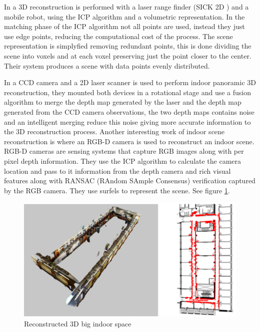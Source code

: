 In \cite{keqiang} a 3D reconstruction is performed with a laser range finder (SICK 2D ) and a mobile robot, 
using the ICP algorithm and a volumetric representation. In the matching phase of the ICP algorithm not all
 points are used, instead they just use edge points, reducing the computational cost of the process. The scene 
 representation is simplyfied removing redundant points, this is done dividing the scene into voxels and at each 
 voxel preserving just the point closer to the center. Their system produces a scene with data points evenly 
 distributed.

In \cite{wei} a CCD camera and a 2D laser scanner is used to perform indoor panoramic 3D reconstruction, 
they mounted both devices in a rotational stage and use a fusion algorithm to merge the depth map generated by the laser 
and the depth map generated from the CCD camera observations, the two depth maps contains noise and an intelligent merging reduce this
 noise giving more accurate information to the 3D reconstruction process. Another interesting work of indoor scene reconstruction is \cite{henry} where an RGB-D camera is used to reconstruct an indoor scene. RGB-D cameras are sensing systems that capture RGB images
 along with per pixel depth information. They use the ICP algorithm to calculate the camera location and pass to it information from 
the depth camera and  rich visual
 features along with RANSAC (RAndom SAmple Consensus) verification captured by the RGB camera. They use surfels \cite{pfister} to represent the scene. See figure \ref{fig:henry}.

\begin{figure}[h!]
\begin{center}
\includegraphics[scale=0.29]{images/henry}
\caption{Reconstructed 3D big indoor space}
\label{fig:henry}
\end{center}
\end{figure}

